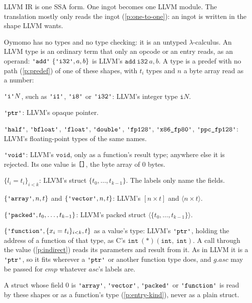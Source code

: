 \documentclass[11pt,letterpaper]{article}
\newcommand{\kw}[1]{\mathtt{#1}}
\newcommand{\str}[1]{\text{\ttfamily\textquotesingle #1\textquotesingle}}  %
\newcommand{\hex}[1]{\text{\ttfamily [#1]}}  %
\newcounter{pt}
\newcommand{\pref}[1]{\ref{#1}}  %
\begin{document}
\begin{points}
\item\label{p:llvm-module} LLVM IR is one SSA form. One ingot becomes one LLVM module. The translation mostly only reads the ingot (\pref{p:one-to-one}):
  an ingot is written in the shape LLVM wants.
\item\label{p:types}
  Oymomo has no types and no type checking: it is an untyped $\lambda$-calculus. An LLVM type is an
  ordinary term that only an opcode or an entry reads, as an operand: $\str{add}\ \{\str{i32}, a, b\}$ is LLVM's
  $\kw{add\ i32}\ a, b$.
  A type is a predef with no path (\pref{p:predef}) of one of these shapes, with $t_i$ types and $n$ a byte array read as a number:
  \begin{subpoints}
  \item $\str{i}N$, such as $\str{i1}$, $\str{i8}$ or $\str{i32}$: LLVM's integer type $\kw{i}N$.
  \item $\str{ptr}$: LLVM's opaque pointer.
  \item $\str{half}$, $\str{bfloat}$, $\str{float}$, $\str{double}$, $\str{fp128}$, $\str{x86\_fp80}$, $\str{ppc\_fp128}$: LLVM's
    floating-point types of the same names.
  \item $\str{void}$: LLVM's $\kw{void}$, only as a function's result type; anywhere else it is rejected. Its one value is
    $\hex{}$, the byte array of $0$ bytes.
  \item $\{l_i = t_i\}_{i<k}$: LLVM's struct $\{t_0, \dots, t_{k-1}\}$. The labels only name the fields.
  \item $\{\str{array}, n, t\}$ and $\{\str{vector}, n, t\}$: LLVM's $[n \times t]$ and $\langle n \times t\rangle$.
  \item $\{\str{packed}, t_0, \dots, t_{k-1}\}$: LLVM's packed struct $\langle\{t_0, \dots, t_{k-1}\}\rangle$.
  \item\label{p:fn-value-type}$\{\str{function}, \{x_i = t_i\}_{i<k}, t\}$ as a value's type: LLVM's $\str{ptr}$, holding the address of a
    function of that type, as C's $\kw{int\ (*)(int,\ int)}$. A call through the value (\pref{p:indirect}) reads its
    parameters and result from it. As in LLVM it is a $\str{ptr}$, so it fits wherever a $\str{ptr}$ or another function
    type does, and $g.\mathit{asc}$ may be passed for $\mathit{cmp}$ whatever $\mathit{asc}$'s labels are.
  \item A struct whose field $0$ is $\str{array}$, $\str{vector}$, $\str{packed}$ or $\str{function}$ is read by these
    shapes or as a function's type (\pref{p:entry-kind}), never as a plain struct.

\end{subpoints}
\end{points}
\end{document}
